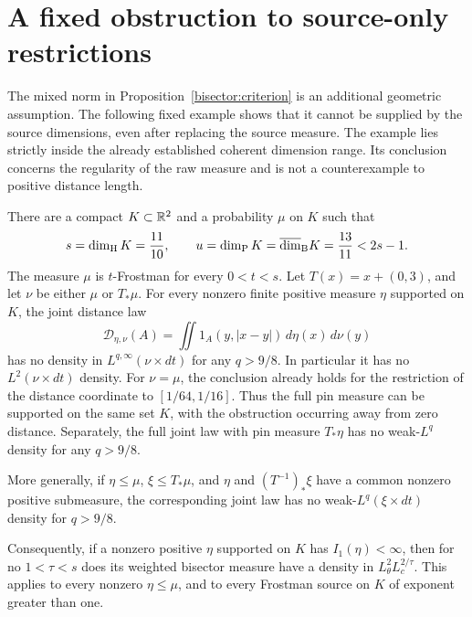 \section{A fixed obstruction to source-only restrictions}
\label{sourceobs:section}

The mixed norm in Proposition~\ref{bisector:criterion} is an additional
geometric assumption. The following fixed example shows that it cannot
be supplied by the source dimensions, even after replacing the source
measure. The example lies strictly inside the already established
coherent dimension range. Its conclusion concerns the regularity of
the raw measure and is not a counterexample to positive distance length.

\begin{theorem}\label{sourceobs:theorem}
There are a compact \(K\subset\mathbb R^2\) and a probability \(\mu\) on \(K\)
such that
\begin{equation}\label{sourceobs:dimensions}
 s=\dim_{\mathrm H} K=\frac{11}{10},\qquad
 u=\dim_{\mathrm P} K=\overline{\dim}_{\mathrm B}K=\frac{13}{11}<2s-1.
\end{equation}
The measure \(\mu\) is \(t\)-Frostman for every \(0<t<s\).
Let \(T(x)=x+(0,3)\), and let \(\nu\) be either \(\mu\) or
\(T_*\mu\). For every nonzero finite
positive measure \(\eta\) supported on \(K\), the joint distance law
\[
 \mathcal D_{\eta,\nu}(A)
 =\iint 1_A(y,|x-y|)\,d\eta(x)\,d\nu(y)
\]
has no density in \(L^{q,\infty}(\nu\times dt)\) for any \(q>9/8\).
In particular it has no \(L^2(\nu\times dt)\) density. For
\(\nu=\mu\), the conclusion already holds for the restriction
of the distance coordinate to \([1/64,1/16]\). Thus the full
pin measure can be supported on the same set \(K\), with the
obstruction occurring away from zero distance.
Separately, the full joint law with pin measure \(T_*\eta\)
has no weak-\(L^q\) density for any \(q>9/8\).

More generally, if \(\eta\le\mu\), \(\xi\le T_*\mu\), and \(\eta\) and
\((T^{-1})_*\xi\) have a common nonzero positive submeasure, the
corresponding joint law has no weak-\(L^q(\xi\times dt)\) density for
\(q>9/8\).

Consequently, if a nonzero positive \(\eta\) supported on \(K\) has
\(I_1(\eta)<\infty\), then for no \(1<\tau<s\) does its weighted
bisector measure have a density in
\(L^2_\theta L^{2/\tau}_c\). This applies to every nonzero
\(\eta\le\mu\), and to every Frostman source on \(K\) of exponent
greater than one.
\end{theorem}

